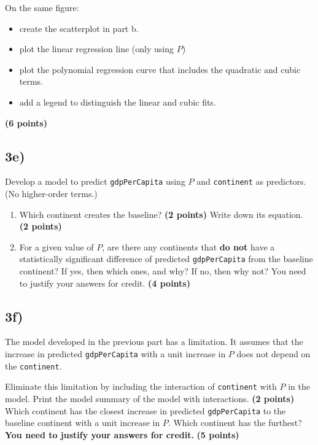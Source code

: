 \documentclass[
  letterpaper,
  DIV=11,
  numbers=noendperiod]{scrreprt}
\providecommand{\tightlist}{%
  \setlength{\itemsep}{0pt}\setlength{\parskip}{0pt}}\usepackage{longtable,booktabs,array}
\begin{document}
On the same figure:

\begin{itemize}
\tightlist
\item
  create the scatterplot in part b.
\item
  plot the linear regression line (only using \(P\))
\item
  plot the polynomial regression curve that includes the quadratic and
  cubic terms.
\item
  add a legend to distinguish the linear and cubic fits.
\end{itemize}

\textbf{(6 points)}

\subsection{3e)}\label{e-3}

Develop a model to predict \texttt{gdpPerCapita} using \(P\) and
\texttt{continent} as predictors. (No higher-order terms.)

\begin{enumerate}
\def\labelenumi{\arabic{enumi}.}
\item
  Which continent creates the baseline? \textbf{(2 points)} Write down
  its equation. \textbf{(2 points)}
\item
  For a given value of \(P\), are there any continents that \textbf{do
  not} have a statistically significant difference of predicted
  \texttt{gdpPerCapita} from the baseline continent? If yes, then which
  ones, and why? If no, then why not? You need to justify your answers
  for credit. \textbf{(4 points)}
\end{enumerate}

\subsection{3f)}\label{f-2}

The model developed in the previous part has a limitation. It assumes
that the increase in predicted \texttt{gdpPerCapita} with a unit
increase in \(P\) does not depend on the \texttt{continent}.

Eliminate this limitation by including the interaction of
\texttt{continent} with \(P\) in the model. Print the model summary of
the model with interactions. \textbf{(2 points)} Which continent has the
closest increase in predicted \texttt{gdpPerCapita} to the baseline
continent with a unit increase in \(P\). Which continent has the
furthest? \textbf{You need to justify your answers for credit.}
\textbf{(5 points)}
\end{document}
